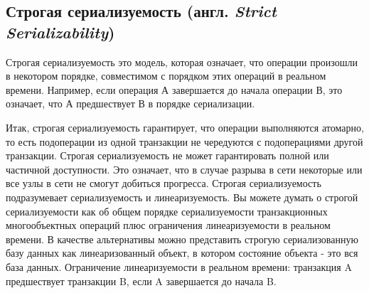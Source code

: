 \documentclass[12pt,  openany]{book}
\begin{document}
\subsection{Строгая сериализуемость (англ.  \textit{Strict Serializability})}
Строгая сериализуемость это  модель, которая означает, что операции произошли в некотором порядке, совместимом с порядком этих операций в реальном времени. Например, если операция А завершается до начала операции В, это означает, что А предшествует В в порядке сериализации.
\par
Итак, строгая сериализуемость гарантирует, что операции выполняются атомарно, то есть подоперации из одной транзакции не чередуются с подоперациями другой транзакции.
Строгая сериализуемость не может гарантировать полной или частичной доступности. Это означает, что в случае разрыва в сети некоторые или все узлы в сети не смогут добиться прогресса.
Строгая сериализуемость подразумевает сериализуемость и линеаризуемость. Вы можете думать о строгой сериализуемости как об общем порядке сериализуемости транзакционных многообъектных операций плюс ограничения линеаризуемости в реальном времени. В качестве альтернативы можно представить строгую сериализованную базу данных как линеаризованный объект, в котором состояние объекта - это вся база данных.
Ограничение линеаризуемости в реальном времени: транзакция A предшествует транзакции B, если A завершается до начала B.
\end{document}
